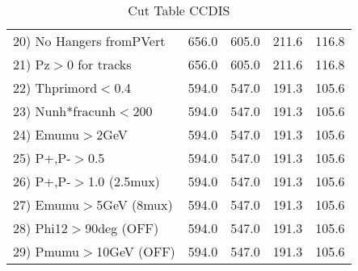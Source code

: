 \begin{table}[h!]
\begin{tabular}{||l||r|r|r|r||}
 20) No Hangers fromPVert &       656.0 &       605.0 &       211.6 &       116.8 \\
 21) Pz$>$0 for tracks    &       656.0 &       605.0 &       211.6 &       116.8 \\
 22) Thprimord$<$0.4      &       594.0 &       547.0 &       191.3 &       105.6 \\
 23) Nunh*fracunh$<$200   &       594.0 &       547.0 &       191.3 &       105.6 \\
 24) Emumu$>$2GeV         &       594.0 &       547.0 &       191.3 &       105.6 \\
 25) P+,P-$>$0.5          &       594.0 &       547.0 &       191.3 &       105.6 \\
 26) P+,P-$>$1.0 (2.5mux) &       594.0 &       547.0 &       191.3 &       105.6 \\
 27) Emumu$>$5GeV  (8mux) &       594.0 &       547.0 &       191.3 &       105.6 \\
 28) Phi12$>$90deg  (OFF) &       594.0 &       547.0 &       191.3 &       105.6 \\
 29) Pmumu$>$10GeV  (OFF) &       594.0 &       547.0 &       191.3 &       105.6 \\
 \hline
 \hline
 \end{tabular}
 \caption{Cut Table  CCDIS  }
 \label{tab-cut_ccdis}
 \end{table}
